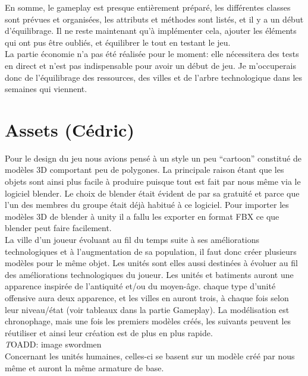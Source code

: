 \documentclass[12pt]{report}
\begin{document}
En somme, le gameplay est presque entièrement préparé, les différentes classes sont prévues et organisées, les attributs et méthodes sont listés, et il y a un début d’équilibrage. Il ne reste maintenant qu’à implémenter cela, ajouter les éléments qui ont pus être oubliés, et équilibrer le tout en testant le jeu.\\
La partie économie n'a pas été réalisée pour le moment: elle nécessitera des tests en direct et n'est pas  indispensable pour avoir un début de jeu. Je m'occuperais donc de l'équilibrage des ressources, des villes et de l'arbre technologique dans les semaines qui viennent.\\


\newpage

\section{Assets (Cédric)}

Pour le design du jeu nous avions pensé à un style un peu “cartoon” constitué de modèles 3D comportant peu de polygones. La principale raison étant que les objets sont ainsi plus facile à produire puisque tout est fait par nous même via le logiciel blender. Le choix de blender était évident de par sa gratuité et parce que l’un des membres du groupe était déjà habitué à ce logiciel. Pour importer les modèles 3D de blender à unity il a fallu les exporter en format FBX ce que blender peut faire facilement.\\

La ville d’un joueur évoluant au fil du temps suite à ses améliorations technologiques et à l’augmentation de sa population, il faut donc créer plusieurs modèles pour le même objet. Les unités sont elles aussi destinées à évoluer au fil des améliorations technologiques du joueur. Les unités et batiments auront une apparence inspirée de l'antiquité et/ou du moyen-âge. chaque type d'unité offensive aura deux apparence, et les villes en auront trois, à chaque fois selon leur niveau/état (voir tableaux dans la partie Gameplay). La modélisation est chronophage, mais une fois les premiers modèles créés, les suivants peuvent les réutiliser et ainsi leur création est de plus en plus rapide.\\

\textit TOADD: image swordmen\\

Concernant les unités humaines, celles-ci se basent sur un modèle créé par nous même et auront la même armature de base.\\
\end{document}

